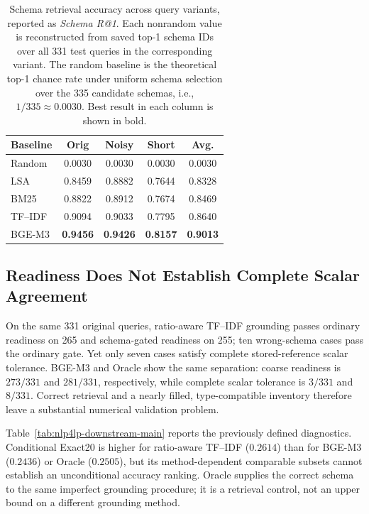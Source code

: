 \documentclass[pdflatex,iicol,sn-basic,Numbered]{sn-jnl}
\begin{document}
\begin{table}[t]
  \centering
  \renewcommand{\arraystretch}{1.18}
  \caption{Schema retrieval accuracy across query variants, reported as \textit{Schema R@1}. Each nonrandom value is reconstructed from saved top-1 schema IDs over all 331 test queries in the corresponding variant. The random baseline is the theoretical top-1 chance rate under uniform schema selection over the 335 candidate schemas, i.e., $1/335 \approx 0.0030$. Best result in each column is shown in bold.}
  \label{tab:nlp4lp-retrieval-main}
  \small
  \setlength{\tabcolsep}{3pt}
  \begin{tabular}{lcccc}
    \toprule
    Baseline & Orig & Noisy & Short & Avg. \\
    \midrule
    Random  & 0.0030 & 0.0030 & 0.0030 & 0.0030 \\
    LSA     & 0.8459 & 0.8882 & 0.7644 & 0.8328 \\
    BM25    & 0.8822 & 0.8912 & 0.7674 & 0.8469 \\
    TF--IDF & 0.9094 & 0.9033 & 0.7795 & 0.8640 \\
    BGE-M3 & \textbf{0.9456} & \textbf{0.9426} & \textbf{0.8157} & \textbf{0.9013} \\
    \bottomrule
  \end{tabular}
\end{table}
\subsection{Readiness Does Not Establish Complete Scalar Agreement}
\label{subsec:exp_downstream}
On the same 331 original queries, ratio-aware TF--IDF grounding passes ordinary readiness on 265 and schema-gated readiness on 255; ten wrong-schema cases pass the ordinary gate. Yet only seven cases satisfy complete stored-reference scalar tolerance. BGE-M3 and Oracle show the same separation: coarse readiness is $273/331$ and $281/331$, respectively, while complete scalar tolerance is $3/331$ and $8/331$. Correct retrieval and a nearly filled, type-compatible inventory therefore leave a substantial numerical validation problem.

Table~\ref{tab:nlp4lp-downstream-main} reports the previously defined diagnostics. Conditional Exact20 is higher for ratio-aware TF--IDF ($0.2614$) than for BGE-M3 ($0.2436$) or Oracle ($0.2505$), but its method-dependent comparable subsets cannot establish an unconditional accuracy ranking. Oracle supplies the correct schema to the same imperfect grounding procedure; it is a retrieval control, not an upper bound on a different grounding method.
\end{document}

